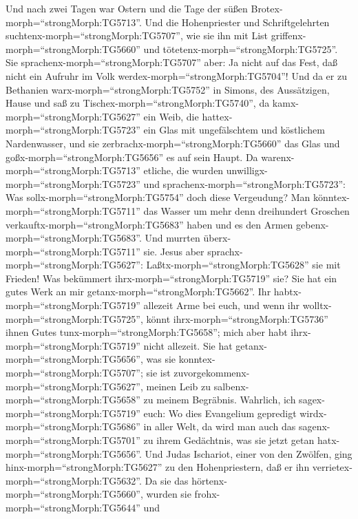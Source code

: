  Und nach zwei Tagen war Ostern und die Tage der süßen
Brotex-morph=``strongMorph:TG5713''. Und die Hohenpriester und
Schriftgelehrten suchtenx-morph=``strongMorph:TG5707'', wie sie ihn mit
List griffenx-morph=``strongMorph:TG5660'' und
tötetenx-morph=``strongMorph:TG5725''.  Sie
sprachenx-morph=``strongMorph:TG5707'' aber: Ja nicht auf das Fest, daß
nicht ein Aufruhr im Volk werdex-morph=``strongMorph:TG5704''!
 Und da er zu Bethanien warx-morph=``strongMorph:TG5752'' in
Simons, des Aussätzigen, Hause und saß zu
Tischex-morph=``strongMorph:TG5740'', da
kamx-morph=``strongMorph:TG5627'' ein Weib, die
hattex-morph=``strongMorph:TG5723'' ein Glas mit ungefälschtem und
köstlichem Nardenwasser, und sie zerbrachx-morph=``strongMorph:TG5660''
das Glas und goßx-morph=``strongMorph:TG5656'' es auf sein Haupt.
 Da warenx-morph=``strongMorph:TG5713'' etliche, die wurden
unwilligx-morph=``strongMorph:TG5723'' und
sprachenx-morph=``strongMorph:TG5723'': Was
sollx-morph=``strongMorph:TG5754'' doch diese Vergeudung? 
Man könntex-morph=``strongMorph:TG5711'' das Wasser um mehr denn
dreihundert Groschen verkauftx-morph=``strongMorph:TG5683'' haben und es
den Armen gebenx-morph=``strongMorph:TG5683''. Und murrten
überx-morph=``strongMorph:TG5711'' sie.  Jesus aber
sprachx-morph=``strongMorph:TG5627'': Laßtx-morph=``strongMorph:TG5628''
sie mit Frieden! Was bekümmert ihrx-morph=``strongMorph:TG5719'' sie?
Sie hat ein gutes Werk an mir getanx-morph=``strongMorph:TG5662''.
 Ihr habtx-morph=``strongMorph:TG5719'' allezeit Arme bei
euch, und wenn ihr wolltx-morph=``strongMorph:TG5725'', könnt
ihrx-morph=``strongMorph:TG5736'' ihnen Gutes
tunx-morph=``strongMorph:TG5658''; mich aber habt
ihrx-morph=``strongMorph:TG5719'' nicht allezeit.  Sie hat
getanx-morph=``strongMorph:TG5656'', was sie
konntex-morph=``strongMorph:TG5707''; sie ist
zuvorgekommenx-morph=``strongMorph:TG5627'', meinen Leib zu
salbenx-morph=``strongMorph:TG5658'' zu meinem Begräbnis. 
Wahrlich, ich sagex-morph=``strongMorph:TG5719'' euch: Wo dies
Evangelium gepredigt wirdx-morph=``strongMorph:TG5686'' in aller Welt,
da wird man auch das sagenx-morph=``strongMorph:TG5701'' zu ihrem
Gedächtnis, was sie jetzt getan hatx-morph=``strongMorph:TG5656''.
 Und Judas Ischariot, einer von den Zwölfen, ging
hinx-morph=``strongMorph:TG5627'' zu den Hohenpriestern, daß er ihn
verrietex-morph=``strongMorph:TG5632''.  Da sie das
hörtenx-morph=``strongMorph:TG5660'', wurden sie
frohx-morph=``strongMorph:TG5644'' und
